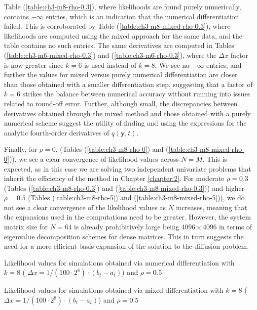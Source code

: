 Table (\ref{table:ch3-m8-rho-0.3}), where likelihoods are found purely numerically, contains $-\infty$ entries, which is an indication that the numerical differentiation failed. This is corroborated by Table (\ref{table:ch3-m8-mixed-rho-0.3}), where likelihoods are computed using the mixed approach for the same data, and the table contains no such entries. The same derivatives are computed in Tables (\ref{table:ch3-m6-mixed-rho-0.3}) and (\ref{table:ch3-m6-rho-0.3}), where the $\Delta x$ factor is now greater since $k=6$ is used instead of $k=8$. We see no $-\infty$ entries, and further the values for mixed versus purely numerical differentiation are closer than those obtained with a smaller differentiation step, suggesting that a factor of $k=6$ strikes the balance between numerical accuracy without running into issues related to round-off error. Further, although small, the discrepancies between derivatives obtained through the mixed method and those obtained with a purely numerical scheme suggest the utility of finding and using the expressions for the analytic fourth-order derivatives of $q(\mathbf{y}, t)$. 

Finally, for $\rho = 0$, (Tables (\ref{table:ch3-m8-rho-0}) and (\ref{table:ch3-m8-mixed-rho-0})), we see a clear convergence of likelihood values across $N=M$. This is expected, as in this case we are solving two independent univariate problems that inherit the efficiency of the method in Chapter \ref{chapter:2}. For moderate $\rho = 0.3$ (Tables (\ref{table:ch3-m8-rho-0.3}) and (\ref{table:ch3-m8-mixed-rho-0.3})) and higher $\rho = 0.5$ (Tables (\ref{table:ch3-m8-rho-5}) and (\ref{table:ch3-m8-mixed-rho-5})), we do not see a clear convergence of the likelihood values as $N$ increases, meaning that the expansions used in the computations need to be greater. However, the system matrix size for $N = 64$ is already prohibitively large being $4096 \times 4096$ in terms  of eigenvalue decomposition schemes for dense matrices. This in turn suggests the need for a more efficient basis expansion of the solution to the diffusion problem. 

\begin{table}[h]
	\centering
	\caption{Likelihood values for simulations obtained via numerical differentiation with $k=8$ ( $\Delta x = 1/(100 \cdot 2^8) \cdot (b_t-a_t)$) and $\rho = 0.5$ }
	\label{table:ch3-m8-rho-5}
\end{table}

\begin{table}[h]
	\centering
	\caption{Likelihood values for simulations obtained via mixed differentiation with $k=8$ ( $\Delta x = 1/(100 \cdot 2^8) \cdot (b_t-a_t)$) and $\rho = 0.5$ }
	\label{table:ch3-m8-mixed-rho-5}
\end{table}

